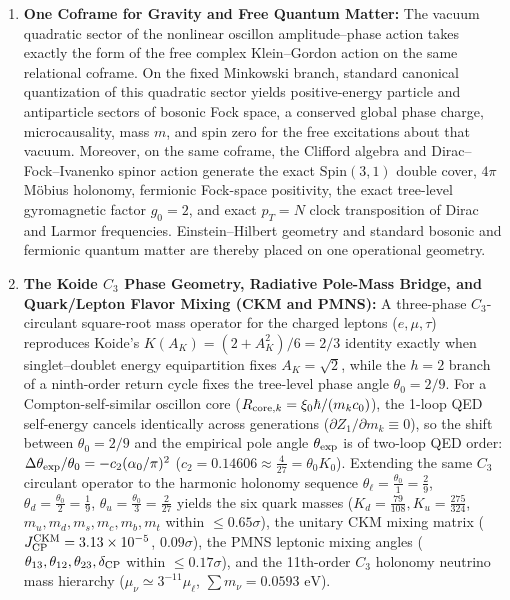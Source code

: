\documentclass[11pt,a4paper]{article}
\begin{document}
\begin{enumerate}[label=\arabic*.]
\item \textbf{One Coframe for Gravity and Free Quantum Matter:} The vacuum quadratic sector of the nonlinear oscillon amplitude--phase action takes exactly the form of the free complex Klein--Gordon action on the same relational coframe. On the fixed Minkowski branch, standard canonical quantization of this quadratic sector yields positive-energy particle and antiparticle sectors of bosonic Fock space, a conserved global phase charge, microcausality, mass $m$, and spin zero for the free excitations about that vacuum. Moreover, on the same coframe, the Clifford algebra and Dirac--Fock--Ivanenko spinor action generate the exact $\mathrm{Spin}(3,1)$ double cover, $4\pi$ Möbius holonomy, fermionic Fock-space positivity, the exact tree-level gyromagnetic factor $g_0=2$, and exact $p_T = N$ clock transposition of Dirac and Larmor frequencies. Einstein--Hilbert geometry and standard bosonic and fermionic quantum matter are thereby placed on one operational geometry.
\item \textbf{The Koide $C_3$ Phase Geometry, Radiative Pole-Mass Bridge, and Quark/Lepton Flavor Mixing (CKM and PMNS):} A three-phase $C_3$-circulant square-root mass operator for the charged leptons ($e,\mu,\tau$) reproduces Koide's $K(A_K) = (2+A_K^2)/6 = 2/3$ identity exactly when singlet--doublet energy equipartition fixes $A_K=\sqrt2$, while the $h=2$ branch of a ninth-order return cycle fixes the tree-level phase angle $\theta_0=2/9$. For a Compton-self-similar oscillon core ($R_{{\rm core},k} = \xi_0\hbar/(m_k c_0)$), the 1-loop QED self-energy cancels identically across generations ($\partial Z_1/\partial m_k \equiv 0$), so the shift between $\theta_0 = 2/9$ and the empirical pole angle $\theta_{\rm exp}$ is of two-loop QED order: $\Delta\theta_{\rm exp}/\theta_0 = -c_2(\alpha_0/\pi)^2$ ($c_2 = 0.14606 \approx \frac{4}{27} = \theta_0 K_0$). Extending the same $C_3$ circulant operator to the harmonic holonomy sequence $\theta_\ell = \frac{\theta_0}{1} = \frac{2}{9}$, $\theta_d = \frac{\theta_0}{2} = \frac{1}{9}$, $\theta_u = \frac{\theta_0}{3} = \frac{2}{27}$ yields the six quark masses ($K_d = \frac{79}{108}, K_u = \frac{275}{324}$, $m_u, m_d, m_s, m_c, m_b, m_t$ within $\le 0.65\sigma$), the unitary CKM mixing matrix ($J_{\rm CP}^{\rm CKM} = 3.13\times 10^{-5}$, $0.09\sigma$), the PMNS leptonic mixing angles ($\theta_{13}, \theta_{12}, \theta_{23}, \delta_{\rm CP}$ within $\le 0.17\sigma$), and the 11th-order $C_3$ holonomy neutrino mass hierarchy ($\mu_\nu \simeq 3^{-11}\mu_\ell$, $\sum m_\nu = 0.0593\text{ eV}$).

\end{enumerate}
\end{document}
